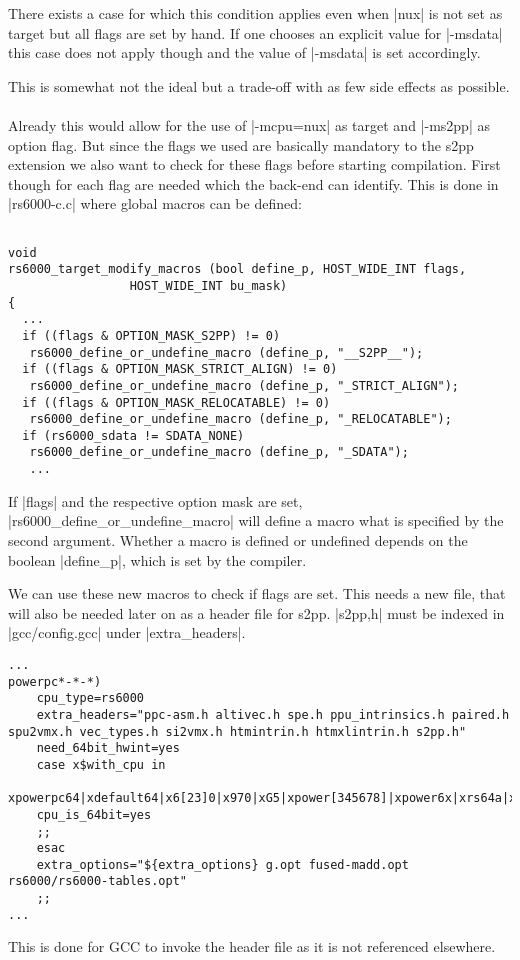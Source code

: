 There exists a case for which this condition applies even when |nux| is not set as target but all flags are set by hand.
If one chooses an explicit value for |-msdata| this case does not apply though and the value of |-msdata| is set accordingly.

This is somewhat not the ideal but a trade-off with as few side effects as possible.
\\
\\
Already this would allow for the use of |-mcpu=nux| as target and |-ms2pp| as option flag.
But since the flags we used are basically mandatory to the s2pp extension we also want to check for these flags before starting compilation.
First though for each flag are needed which the back-end can identify.
This is done in |rs6000-c.c| where global macros can be defined:

\begin{lstlisting}

void
rs6000_target_modify_macros (bool define_p, HOST_WIDE_INT flags,
                 HOST_WIDE_INT bu_mask)
{
  ...
  if ((flags & OPTION_MASK_S2PP) != 0)
   rs6000_define_or_undefine_macro (define_p, "__S2PP__");
  if ((flags & OPTION_MASK_STRICT_ALIGN) != 0)
   rs6000_define_or_undefine_macro (define_p, "_STRICT_ALIGN");
  if ((flags & OPTION_MASK_RELOCATABLE) != 0)
   rs6000_define_or_undefine_macro (define_p, "_RELOCATABLE");
  if (rs6000_sdata != SDATA_NONE)
   rs6000_define_or_undefine_macro (define_p, "_SDATA");
   ...
\end{lstlisting}

If |flags| and the respective option mask are set, |rs6000_define_or_undefine_macro| will define a macro what is specified by the second argument.
Whether a macro is defined or undefined depends on the boolean |define_p|, which is set by the compiler.

We can use these new macros to check if flags are set.
This needs a new file, that will also be needed later on as a header file for s2pp.
|s2pp,h| must be indexed in |gcc/config.gcc| under |extra_headers|.
\begin{lstlisting}
...
powerpc*-*-*)
    cpu_type=rs6000
    extra_headers="ppc-asm.h altivec.h spe.h ppu_intrinsics.h paired.h spu2vmx.h vec_types.h si2vmx.h htmintrin.h htmxlintrin.h s2pp.h"
    need_64bit_hwint=yes
    case x$with_cpu in
    xpowerpc64|xdefault64|x6[23]0|x970|xG5|xpower[345678]|xpower6x|xrs64a|xcell|xa2|xe500mc64|xe5500|Xe6500)
    cpu_is_64bit=yes
    ;;
    esac
    extra_options="${extra_options} g.opt fused-madd.opt rs6000/rs6000-tables.opt"
    ;;
...
\end{lstlisting}
This is done for GCC to invoke the header file as it is not referenced elsewhere.

